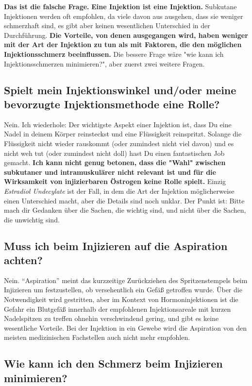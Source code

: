\documentclass{article}
\begin{document}
{\textbf{Das ist die falsche Frage.} \textbf{Eine Injektion ist eine Injektion.} Subkutane Injektionen werden oft empfohlen, da viele davon aus ausgehen, dass sie weniger schmerzhaft sind, es gibt aber keinen wesentlichen Unterschied in der Durchführung. \textbf{Die Vorteile, von denen ausgegangen wird, haben weniger mit der Art der Injektion zu tun als mit Faktoren, die den möglichen Injektionsschmerz beeinflussen.} Die bessere Frage wäre "wie kann ich Injektionsschmerzen minimieren?", aber zuerst zwei weitere Fragen.

\subsection{Spielt mein Injektionswinkel und/oder meine bevorzugte Injektionsmethode eine Rolle?}

Nein. Ich wiederhole: Der wichtigste Aspekt einer Injektion ist, dass Du eine Nadel in deinem Körper reinsteckst und eine Flüssigkeit reinspritzt. Solange die Flüssigkeit nicht wieder rauskommt (oder zumindest nicht viel davon) und es nicht weh tut (oder zumindest nicht doll) hast Du einen fantastischen Job gemacht. \textbf{Ich kann nicht genug betonen, dass die "Wahl" zwischen subkutaner und intramuskulärer nicht relevant ist und für die Wirksamkeit von injizierbaren Östrogen keine Rolle spielt.} Einzig \textit{Estradiol Undecylate} ist der Fall, in dem die Art der Injektion möglicherweise einen Unterschied macht, aber die Details sind noch unklar. Der Punkt ist: Bitte mach dir Gedanken über die Sachen, die wichtig sind, und nicht über die Sachen, die unwichtig sind.

\subsection{Muss ich beim Injizieren auf die Aspiration achten?}

Nein. “Aspiration” meint das kurzzeitige Zurückziehen des Spritzenstempels beim Injizieren um festzustellen, ob versehentlich ein Gefäß getroffen wurde. Über die Notwendigkeit wird gestritten, aber im Kontext von Hormoninjektionen ist die Gefahr ein Blutgefäß innerhalb der empfohlenen Injektionsareale mit kurzen Nadelspitzen zu treffen ohnehin verschwindend gering, und gibt es keine wesentliche Vorteile. Bei der Injektion in ein Gewebe wird die Aspiration von den meisten medizinischen Fachstellen auch nicht mehr empfohlen.

\subsection{Wie kann ich den Schmerz beim Injizieren minimieren?}

}
\end{document}
